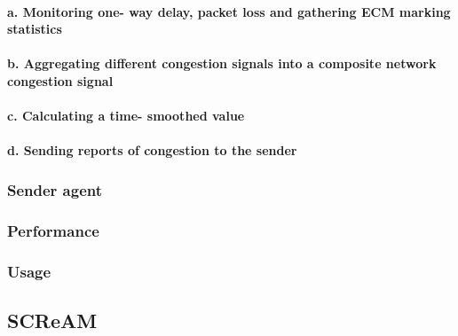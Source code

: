 \paragraph{a. Monitoring one- way delay, packet loss and gathering ECM marking statistics}
\paragraph{b. Aggregating different congestion signals into a composite network congestion signal}
\paragraph{c. Calculating a time- smoothed value}
\paragraph{d. Sending reports of congestion to the sender}

\subsubsection{Sender agent}
\subsubsection{Performance}
\subsubsection{Usage}

\subsection{SCReAM}
